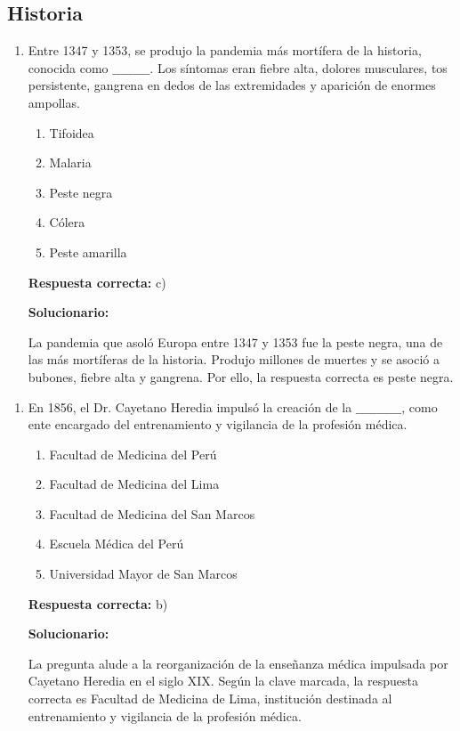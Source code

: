 \subsection*{Historia}

\begin{enumerate}[resume]
	
	\item Entre 1347 y 1353, se produjo la pandemia más mortífera de la historia, conocida como $\_\_\_\_\_\_\_\_\_$. Los síntomas eran fiebre alta, dolores musculares, tos persistente, gangrena en dedos de las extremidades y aparición de enormes ampollas.
	
	\begin{enumerate}[label=\alph*)]
		\item Tifoidea
		\item Malaria
		\item Peste negra
		\item Cólera 
		\item Peste amarilla
	\end{enumerate}
	
	\textbf{Respuesta correcta:} c)
	
	\vspace{2mm}
	\textbf{Solucionario:}
	
	La pandemia que asoló Europa entre 1347 y 1353 fue la peste negra, una de las más mortíferas de la historia. Produjo millones de muertes y se asoció a bubones, fiebre alta y gangrena. Por ello, la respuesta correcta es peste negra.
	
\end{enumerate}

\begin{enumerate}[resume]
	
	\item En 1856, el Dr. Cayetano Heredia impulsó la creación de la $\_\_\_\_\_\_\_\_\_\_\_$, como ente encargado del entrenamiento y vigilancia de la profesión médica.
	
	\begin{enumerate}[label=\alph*)]
		\item Facultad de Medicina del Perú
		\item Facultad de Medicina del Lima
		\item Facultad de Medicina del San Marcos
		\item Escuela Médica del Perú
		\item Universidad Mayor de San Marcos
		
	\end{enumerate}
	
	\textbf{Respuesta correcta:} b)
	
	\vspace{2mm}
	\textbf{Solucionario:}
	
	La pregunta alude a la reorganización de la enseñanza médica impulsada por Cayetano Heredia en el siglo XIX. Según la clave marcada, la respuesta correcta es Facultad de Medicina de Lima, institución destinada al entrenamiento y vigilancia de la profesión médica.
	
\end{enumerate}


